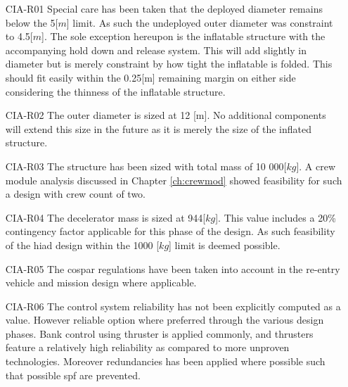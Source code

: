 \begin{itemize}[leftmargin=+20mm]
\item[CIA-R01] Special care has been taken that the deployed diameter remains below the 5[$m$] limit. As such the undeployed outer diameter was constraint to 4.5[$m$]. The sole exception hereupon is the inflatable structure with the accompanying hold down and release system. This will add slightly in diameter but is merely constraint by how tight the inflatable is folded. This should fit easily within the 0.25[m] remaining margin on either side considering the thinness of the inflatable structure. 
\item[CIA-R02] The outer diameter is sized at 12 [m]. No additional components will extend this size in the future as it is merely the size of the inflated structure.
\item[CIA-R03] The structure has been sized with total mass of 10 000[$kg$]. A crew module analysis discussed in Chapter \ref{ch:crewmod} showed feasibility for such a design with crew count of two.
\item[CIA-R04] The decelerator mass is sized at 944[$kg$]. This value includes a 20\% contingency factor applicable for this phase of the design. As such feasibility of the \gls{hiad} design within the 1000 [$kg$] limit is deemed possible.
\item[CIA-R05] The \gls{cospar} regulations have been taken into account in the re-entry vehicle and mission design where applicable.
\item[CIA-R06] The control system reliability has not been explicitly computed as a value. However reliable option where preferred through the various design phases. Bank control using thruster is applied commonly, and thrusters feature a relatively high reliability as compared to more unproven technologies. Moreover redundancies has been applied where possible such that possible \gls{spf} are prevented. 
\end{itemize}



